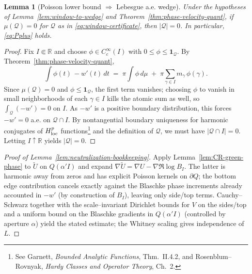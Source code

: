 \documentclass[11pt]{article}
\newtheorem{lemma}[theorem]{Lemma}
\theoremstyle{definition}
\theoremstyle{remark}
\newcommand{\R}{\mathbb{R}}
\begin{document}
\begin{lemma}[Poisson lower bound $\Rightarrow$ Lebesgue a.e. wedge]\label{lem:mu-to-lebesgue}
Under the hypotheses of Lemma~\ref{lem:window-to-wedge} and Theorem~\ref{thm:phase-velocity-quant}, if $\mu(\mathcal Q)=0$ for $\mathcal Q$ as in \eqref{eq:window-certificate}, then $|\mathcal Q|=0$. In particular, \eqref{eq:Pplus} holds.
\end{lemma}
\begin{proof}
Fix $I\Subset\R$ and choose $\phi\in C_c^\infty(I)$ with $0\le\phi\le\mathbf 1_{\mathcal Q}$. By Theorem~\ref{thm:phase-velocity-quant},
\[
  \int \phi(t)\,-w'(t)\,dt \;=\; \pi\!\int\phi\,d\mu \;+\; \pi\!\sum_{\gamma\in I} m_\gamma\,\phi(\gamma).
\]
Since $\mu(\mathcal Q)=0$ and $\phi\le\mathbf 1_{\mathcal Q}$, the first term vanishes; choosing $\phi$ to vanish in small neighborhoods of each $\gamma\in I$ kills the atomic sum as well, so $\int_{\mathcal Q} (-w')=0$ on $I$. As $-w'$ is a positive boundary distribution, this forces $-w'=0$ a.e. on $\mathcal Q\cap I$. By nontangential boundary uniqueness for harmonic conjugates of $H^p_{\rm loc}$ functions\footnote{See Garnett, \emph{Bounded Analytic Functions}, Thm.~II.4.2, and Rosenblum--Rovnyak, \emph{Hardy Classes and Operator Theory}, Ch.~2.} and the definition of $\mathcal Q$, we must have $|\mathcal Q\cap I|=0$. Letting $I\uparrow\R$ yields $|\mathcal Q|=0$.
\end{proof}
\begin{proof}[Proof of Lemma~\ref{lem:neutralization-bookkeeping}]
Apply Lemma~\ref{lem:CR-green-phase} to $\widetilde U$ on $Q(\alpha'I)$ and expand $\nabla\widetilde U=\nabla U-\nabla\Re\log B_I$. The latter is harmonic away from zeros and has explicit Poisson kernels on $\partial Q$; the bottom edge contribution cancels exactly against the Blaschke phase increments already accounted in $-w'$ (by construction of $B_I$), leaving only side/top terms. Cauchy–Schwarz together with the scale–invariant Dirichlet bounds for $V$ on the sides/top and a uniform bound on the Blaschke gradients in $Q(\alpha'I)$ (controlled by aperture $\alpha$) yield the stated estimate; the Whitney scaling gives independence of $L$.
\end{proof}

\end{document}
